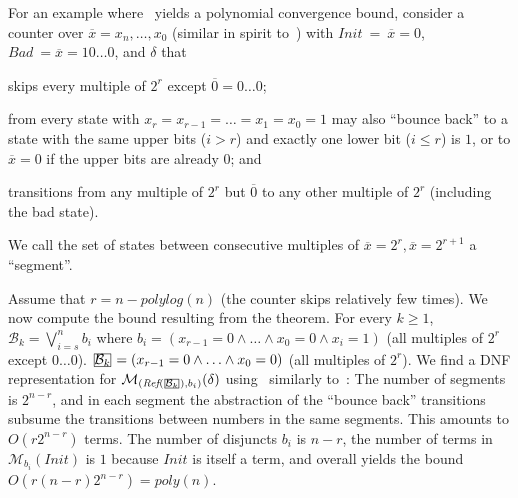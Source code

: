 \documentclass[acmsmall,screen]{acmart}
\newcommand{\ov}{\overline}
\newcommand{\Init}{{\textit{Init}}}
\newcommand{\Bad}{\textit{Bad}}
\newcommand{\tr}{\delta}
\renewcommand{\vec}{\ov}
\newcommand{\bkwrch}[1]{\mathcal{B}_{#1}}
\newcommand{\monox}[2]{\mathcal{M}_{#2}({#1})}
\newcommand{\bigO}{O}
\newcommand{\bkcube}{b}
\newcommand{\reflect}[1]{\textit{Ref}({#1})}
\newcommand\mathbox[1]{\mathord{\ThisStyle{%
  \fboxsep0\LMpt\relax\kern1\LMpt\fbox{$\SavedStyle#1$}\kern1\LMpt}}}
\newcommand{\cubejoin}[1]{\mathbox{#1}}
\begin{document}
\begin{example}
\label{ex:multiskip-counter-poly}
For an example where~ yields a polynomial convergence bound,
consider a counter over $\vec{x}=x_n,\ldots,x_0$ (similar in spirit to~) with $\Init \ = \ \vec{x}=0$, $\Bad \ = \vec{x} = 10\ldots0$, and $\tr$ that
\begin{inparaenum}[(i)]
	\item skips every multiple of $2^r$ except $\vec{0}=0\ldots0$;
	\item from every state with $x_r = x_{r-1} = \ldots = x_1 = x_0 = 1$ may also ``bounce back'' to a state with the same upper bits ($i > r$) and exactly one lower bit ($i \leq r$) is $1$, or to $\vec{x}=0$ if the upper bits are already $0$; and
	\item transitions from any multiple of $2^r$ but $\vec{0}$ to any other multiple of $2^r$ (including the bad state).
\end{inparaenum}
We call the set of states between consecutive multiples of $\vec{x}=2^r,\vec{x}=2^{r+1}$ a ``segment''.

Assume that $r=n-\textit{polylog}(n)$ (the counter skips relatively few times).
We now compute the bound resulting from the theorem.
%
For every $k \geq 1$,
$\bkwrch{k}=\bigvee_{i=s}^{n}{\bkcube_i}$ where $\bkcube_i = (x_{r-1}=0 \land \ldots \land x_0=0 \land x_i=1)$ (all multiples of $2^r$ except $0\ldots0$).
%
$\cubejoin{\bkwrch{k}} = (x_{r-1}=0 \land \ldots \land x_0=0)$ (all multiples of $2^r$).
We find a DNF representation for $\monox{\tr}{(\reflect{\cubejoin{\bkwrch{k}}},\bkcube_i)}$ using~ similarly to~:
The number of segments is $2^{n-r}$, and in each segment
%
the abstraction of the ``bounce back'' transitions subsume the transitions between numbers in the same segments. 
This amounts to $\bigO(r2^{n-r})$ terms. 
The number of disjuncts $\bkcube_i$ is $n-r$, the number of terms in $\monox{\Init}{\bkcube_i}$ is $1$ because $\Init$ is itself a term, and overall  yields the bound $\bigO(r (n-r) 2^{n-r})=\textit{poly}(n)$.
\end{example}
\end{document}
